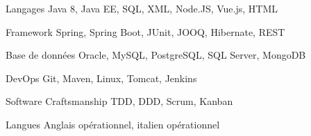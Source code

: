 

\begin{cvskills}

  \cvskill
    {Langages} %
    {Java 8, Java EE, SQL, XML, Node.JS, Vue.js, HTML} %

  \cvskill
    {Framework} %
    {Spring, Spring Boot, JUnit, JOOQ, Hibernate, REST} %

  \cvskill
    {Base de données} %
    {Oracle, MySQL, PostgreSQL, SQL Server, MongoDB} %


  \cvskill
    {DevOps} %
    {Git, Maven, Linux, Tomcat, Jenkins} %

  \cvskill
    {Software Craftsmanship} %
    {TDD, DDD, Scrum, Kanban} %

  \cvskill
    {Langues} %
    {Anglais opérationnel, italien opérationnel} %

\end{cvskills}
